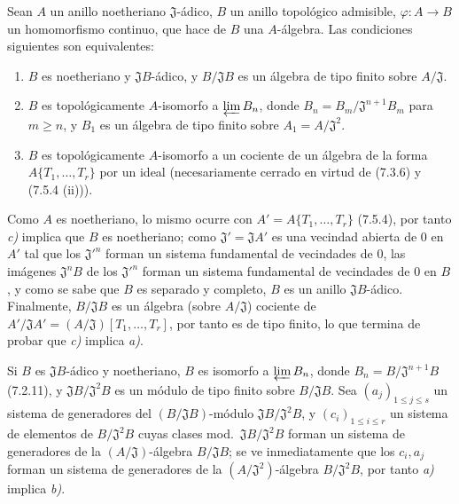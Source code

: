 \begin{proposition}[7.5.5]
\label{0.7.5.5-fr}
Sean $A$ un anillo noetheriano $\mathfrak J$-ádico, $B$ un anillo topológico
admisible, $\varphi:A\to B$ un homomorfismo continuo, que hace de $B$ una
$A$-álgebra. Las condiciones siguientes son equivalentes:
\begin{enumerate}
  \item[a)] $B$ es noetheriano y $\mathfrak JB$-ádico, y
  $B/\mathfrak JB$ es un álgebra de tipo finito sobre $A/\mathfrak J$.

  \item[b)] $B$ es topológicamente $A$-isomorfo a $\varprojlim B_n$, donde
  $B_n=B_m/\mathfrak J^{n+1}B_m$ para $m\geq n$, y $B_1$ es un álgebra de
  tipo finito sobre $A_1=A/\mathfrak J^2$.

  \item[c)] $B$ es topológicamente $A$-isomorfo a un cociente de un álgebra
  de la forma\linebreak $A\{T_1,\ldots,T_r\}$ por un ideal (necesariamente cerrado en virtud
  de \textup{(7.3.6)} y \textup{(7.5.4 (ii))}).
\end{enumerate}
\end{proposition}

Como $A$ es noetheriano, lo mismo ocurre con
$A'=A\{T_1,\ldots,T_r\}$ (7.5.4), por tanto \emph{c)} implica que $B$ es noetheriano;
como $\mathfrak J'=\mathfrak JA'$ es una vecindad abierta de 0 en $A'$ tal
que los $\mathfrak J'^{n}$ forman un sistema fundamental de vecindades de 0,
las imágenes $\mathfrak J^nB$ de los $\mathfrak J'^{n}$ forman un sistema
fundamental de vecindades de 0 en $B$, y como se sabe que $B$ es separado y
completo, $B$ es un anillo $\mathfrak JB$-ádico. Finalmente, $B/\mathfrak JB$ es
un álgebra (sobre $A/\mathfrak J$) cociente de
$A'/\mathfrak JA'=(A/\mathfrak J)[T_1,\ldots,T_r]$, por tanto es de tipo finito, lo
que termina de probar que \emph{c)} implica \emph{a)}.

Si $B$ es $\mathfrak JB$-ádico y noetheriano, $B$ es isomorfo a
$\varprojlim B_n$, donde $B_n=B/\mathfrak J^{n+1}B$ (7.2.11), y
$\mathfrak JB/\mathfrak J^2B$ es un módulo de tipo finito sobre
$B/\mathfrak JB$. Sea $(a_j)_{1\leq j\leq s}$ un sistema de generadores del
$(B/\mathfrak JB)$-módulo $\mathfrak JB/\mathfrak J^2B$, y
$(c_i)_{1\leq i\leq r}$ un sistema de elementos de $B/\mathfrak J^2B$ cuyas
clases
mod.~$\mathfrak JB/\mathfrak J^2B$ forman un sistema de generadores de la
$(A/\mathfrak J)$-álgebra $B/\mathfrak JB$; se ve inmediatamente que los $c_i,a_j$
forman un sistema de generadores de la $(A/\mathfrak J^2)$-álgebra
$B/\mathfrak J^2B$, por tanto \emph{a)} implica \emph{b)}.

